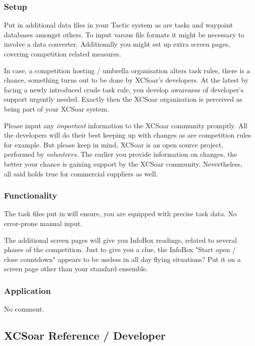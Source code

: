 \subsubsection*{Setup} Put in additional data files in your Tactic system as are 
tasks and waypoint databases amongst others. To input varous file formats it 
might be necessary to involve a data converter. Additionally you might set up 
extra screen pages, covering competition related measures.

In case, a competition hosting / umbrella organisation alters task rules, there 
is a chance, something turns out to be done by XCSoar's developers. At the latest 
by facing a newly introduced crude task rule, you develop awareness of 
developer's support urgently needed. Exactly then the XCSoar organisation is 
perceived as being part of your XCSoar system.

Please input any \emph{important} information to the XCSoar community promptly. 
All the developers will do their best keeping up with changes as are competition 
rules for example. But please keep in mind, XCSoar is an open source project, 
performed by \emph{volunteers}. The earlier you provide information on changes, 
the better your chance is gaining support by the XCSoar community. Nevertheless, 
all said holds true for commercial suppliers as well.  

\subsubsection*{Functionality} The task files put in will ensure, you are 
equipped with precise task data. No error-prone manual input.

The additional screen pages will give you InfoBox readings, related to several 
phases of the competition. Just to give you a clue, the InfoBox "Start open /
close countdown" appears to be useless in all day flying situations? Put it on a 
screen page other than your standard ensemble.

\subsubsection*{Application}
No comment.

\subsection*{XCSoar Reference / Developer}
